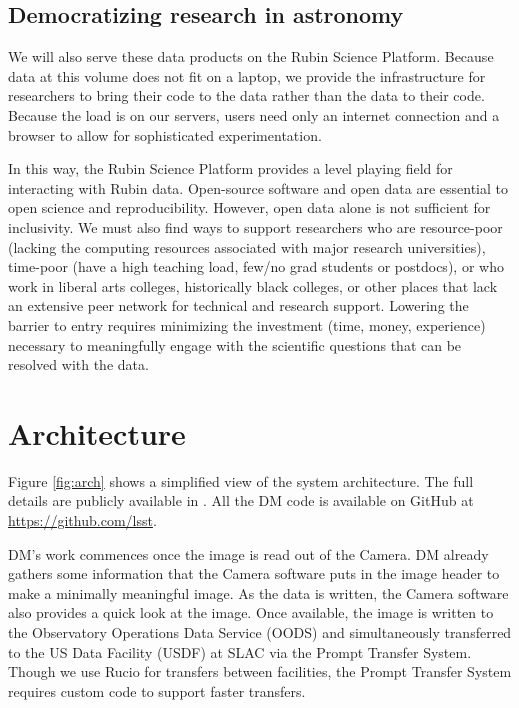 \documentclass[11pt,twoside]{article}
\begin{document}
\subsection{Democratizing research in astronomy}

We will also serve these data products on the Rubin Science Platform.
Because data at this volume does not fit on a laptop, we provide the infrastructure for researchers to bring their code to the data rather than the data to their code.
Because the load is on our servers, users need only an internet connection and a browser to allow for sophisticated experimentation.

In this way, the Rubin Science Platform provides a level playing field for interacting with Rubin data.
Open-source software and open data are essential to open science and reproducibility. However, open data alone is not sufficient for inclusivity.
We must also find ways to support researchers who are resource-poor (lacking the computing resources associated with major research universities), time-poor (have a high teaching load, few/no grad students or postdocs), or who work in liberal arts colleges, historically black colleges, or other places that lack an extensive peer network for technical and research support.
Lowering the barrier to entry requires minimizing the investment (time, money, experience) necessary to meaningfully engage with the scientific questions that can be resolved with the data.

\section{Architecture}

Figure \ref{fig:arch} shows a simplified view of the system architecture. The full details are publicly available in \citep{LDM-148}. All the DM code is available on GitHub at \url{https://github.com/lsst}.

\begin{centering}
\end{centering}

DM's work commences once the image is read out of the Camera. DM already gathers some information that the Camera software puts in the image header to make a minimally meaningful image.
As the data is written, the Camera software also provides a quick look at the image.
Once available, the image is written to the Observatory Operations Data Service (OODS) and simultaneously transferred to the US Data Facility (USDF) at SLAC via the Prompt Transfer System. Though we use Rucio for transfers between facilities, the Prompt Transfer System requires custom code to support faster transfers.
\end{document}
